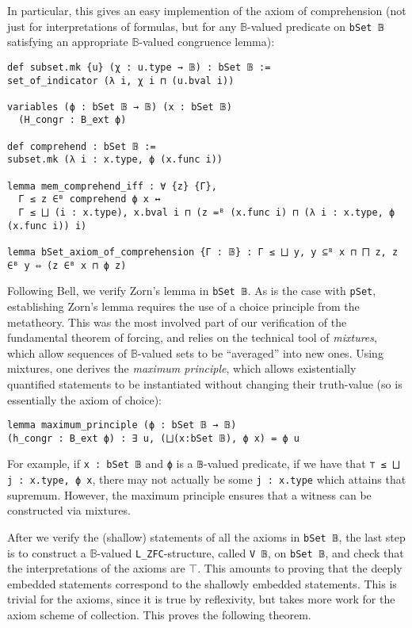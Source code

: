 \documentclass[sigplan,10pt,review, anonymous]{acmart}
\newcommand{\B}{\mathbb{B}}
\newcommand{\lil}{\lstinline}
\theoremstyle{definition}
\begin{document}
In particular, this gives an easy implemention of the axiom of comprehension (not just for interpretations of formulas, but for any \(\mathbb{B}\)-valued predicate on \lil{bSet 𝔹} satisfying an appropriate \(\mathbb{B}\)-valued congruence lemma): \label{def:comprehension} %
\begin{lstlisting}
def subset.mk {u} (χ : u.type → 𝔹) : bSet 𝔹 :=
set_of_indicator (λ i, χ i ⊓ (u.bval i))

variables (ϕ : bSet 𝔹 → 𝔹) (x : bSet 𝔹)
  (H_congr : B_ext ϕ)

def comprehend : bSet 𝔹 :=
subset.mk (λ i : x.type, ϕ (x.func i))

lemma mem_comprehend_iff : ∀ {z} {Γ},
  Γ ≤ z ∈ᴮ comprehend ϕ x ↔
  Γ ≤ ⨆ (i : x.type), x.bval i ⊓ (z =ᴮ (x.func i) ⊓ (λ i : x.type, ϕ (x.func i)) i)

lemma bSet_axiom_of_comprehension {Γ : 𝔹} : Γ ≤ ⨆ y, y ⊆ᴮ x ⊓ ⨅ z, z ∈ᴮ y ⇔ (z ∈ᴮ x ⊓ ϕ z)
\end{lstlisting}
Following Bell, we verify Zorn's lemma in \lil{bSet 𝔹}.
As is the case with \lil{pSet}, establishing Zorn's lemma requires the use of a choice principle from the metatheory.
This was the most involved part of our verification of the fundamental theorem of forcing, and relies on the technical tool of \emph{mixtures}, which allow sequences of $\B$-valued sets to be ``averaged'' into new ones. Using mixtures, one derives the \emph{maximum principle}, which allows existentially quantified statements to be instantiated without changing their truth-value (so is essentially the axiom of choice):
\begin{lstlisting}
lemma maximum_principle (ϕ : bSet 𝔹 → 𝔹)
(h_congr : B_ext ϕ) : ∃ u, (⨆(x:bSet 𝔹), ϕ x) = ϕ u
\end{lstlisting}
For example, if \lil{x : bSet 𝔹} and \lil{ϕ} is a \lil{𝔹}-valued predicate, if we have that \lil{⊤ ≤ ⨆ j : x.type, ϕ x}, there may not actually be some \lil{j : x.type} which attains that supremum. However, the maximum principle ensures that a witness can be constructed via mixtures.


After we verify the (shallow) statements of all the axioms in \lil{bSet 𝔹}, the last step is to construct a \(\mathbb{B}\)-valued \lil{L_ZFC}-structure, called \lil{V 𝔹}, on \lil{bSet 𝔹}, and check that the interpretations of the axioms are \(\top\). This amounts to proving that the deeply embedded statements correspond to the shallowly embedded statements. This is trivial for the axioms, since it is true by reflexivity, but takes more work for the axiom scheme of collection. This proves the following theorem.
\end{document}
